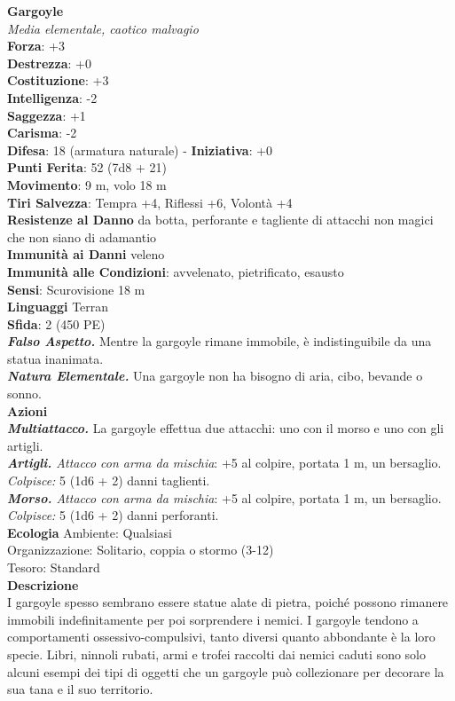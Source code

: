 \begin{multicols}{2}
\medskip\textbf{Gargoyle}\\
\emph{Media elementale, caotico malvagio}\\
\textbf{Forza}: +3\\
\textbf{Destrezza}: +0\\
\textbf{Costituzione}: +3\\
\textbf{Intelligenza}: -2\\
\textbf{Saggezza}: +1\\
\textbf{Carisma}: -2\\
\textbf{Difesa}: 18 (armatura naturale) - \textbf{Iniziativa}: +0\\
\textbf{Punti Ferita}: 52 (7d8 + 21)\\
\textbf{Movimento}: 9 m, volo 18 m\\
\textbf{Tiri Salvezza}: Tempra +4, Riflessi +6, Volontà +4\\
\textbf{Resistenze al Danno} da botta, perforante e tagliente di attacchi non magici che non siano di adamantio\\
\textbf{Immunità ai Danni} veleno\\
\textbf{Immunità alle Condizioni}: avvelenato, pietrificato, esausto\\
\textbf{Sensi}: Scurovisione 18 m\\
\textbf{Linguaggi} Terran\\
\textbf{Sfida}: 2 (450 PE)\smallskip\\
\emph{\textbf{Falso Aspetto.}} Mentre la gargoyle rimane immobile, è indistinguibile da una statua inanimata.\\
\emph{\textbf{Natura Elementale.}} Una gargoyle non ha bisogno di aria, cibo, bevande o sonno.\\
\smallskip\textbf{Azioni}\\
\emph{\textbf{Multiattacco.}} La gargoyle effettua due attacchi: uno con il morso e uno con gli artigli.\\
\emph{\textbf{Artigli.} Attacco con arma da mischia}: +5 al colpire, portata 1 m, un bersaglio.\\
\emph{Colpisce:} 5 (1d6 + 2) danni taglienti.\\
\emph{\textbf{Morso.} Attacco con arma da mischia}: +5 al colpire, portata 1 m, un bersaglio.\\
\emph{Colpisce:} 5 (1d6 + 2) danni perforanti.\\
\textbf{Ecologia}
Ambiente: Qualsiasi\\
Organizzazione: Solitario, coppia o stormo (3-12)\\
Tesoro: Standard\\
\textbf{Descrizione}\\
I gargoyle spesso sembrano essere statue alate di pietra, poiché possono rimanere immobili indefinitamente per poi sorprendere i nemici. I gargoyle tendono a comportamenti ossessivo-compulsivi, tanto diversi quanto abbondante è la loro specie. Libri, ninnoli rubati, armi e trofei raccolti dai nemici caduti sono solo alcuni esempi dei tipi di oggetti che un gargoyle può collezionare per decorare la sua tana e il suo territorio.\\


\end{multicols}
